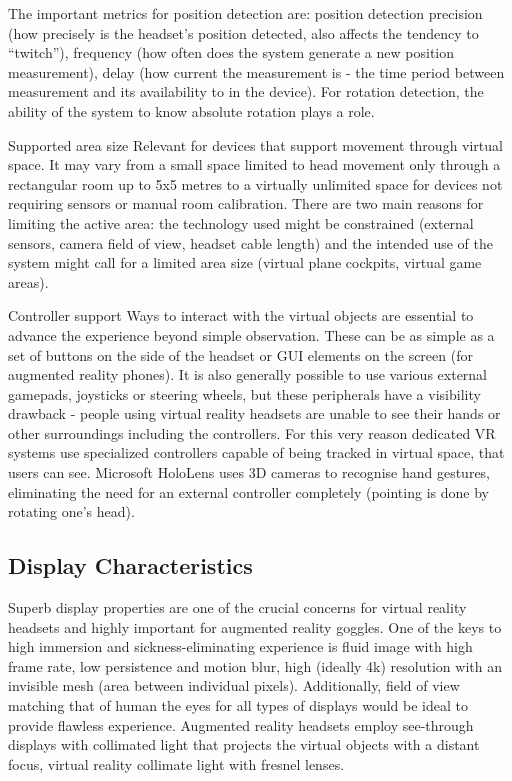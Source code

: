 \documentclass[12pt, a4paper]{article}
\newenvironment{definitions}
{\begin{description}[style=nextline]}
{\end{description}}
\begin{document}
\begin{definitions}
The important metrics for position detection are: position detection precision (how precisely is the headset’s position detected, also affects the tendency to “twitch”), frequency (how often does the system generate a new position measurement), delay (how current the measurement is - the time period between measurement and its availability to in the device). For rotation detection, the ability of the system to know absolute rotation plays a role.
\item[Supported area size] Relevant for devices that support movement through virtual space. It may vary from a small space limited to head movement only through a rectangular room up to 5x5 metres to a virtually unlimited space for devices not requiring sensors or manual room calibration. There are two main reasons for limiting the active area: the technology used might be constrained (external sensors, camera field of view, headset cable length) and the intended use of the system might call for a limited area size (virtual plane cockpits, virtual game areas).


\item[Controller support] Ways to interact with the virtual objects are essential to advance the experience beyond simple observation. These can be as simple as a set of buttons on the side of the headset or GUI elements on the screen (for augmented reality phones). It is also generally possible to use various external gamepads, joysticks or steering wheels, but these peripherals have a visibility drawback - people using virtual reality headsets are unable to see their hands or other surroundings including the controllers. For this very reason dedicated VR systems use specialized controllers capable of being tracked in virtual space, that users can see. Microsoft HoloLens uses 3D cameras to recognise hand gestures, eliminating the need for an external controller completely (pointing is done by rotating one’s head).
\end{definitions}

\subsection{Display Characteristics}
Superb display properties are one of the crucial concerns for virtual reality headsets and highly important for augmented reality goggles. One of the keys to high immersion and sickness-eliminating experience is fluid image with high frame rate, low persistence and motion blur, high (ideally 4k) resolution with an invisible mesh (area between individual pixels). Additionally, field of view matching that of human the eyes for all types of displays would be ideal to provide flawless experience. Augmented reality headsets employ see-through displays with collimated light that projects the virtual objects with a distant focus, virtual reality collimate light with fresnel lenses.
\end{document}
